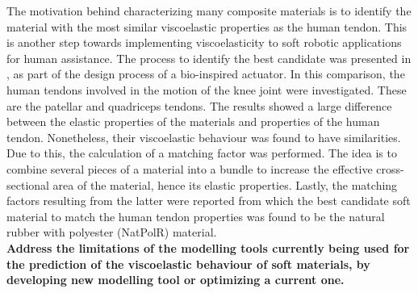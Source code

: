 The motivation behind characterizing many composite materials is to identify the material with the most similar viscoelastic properties as the human tendon. This is another step towards implementing viscoelasticity to soft robotic applications for human assistance. The process to identify the best candidate was presented in , as part of the design process of a bio-inspired actuator. In this comparison, the human tendons involved in the motion of the knee joint were investigated. These are the patellar and quadriceps tendons. The results showed a large difference between the elastic properties of the materials and properties of the human tendon. Nonetheless, their viscoelastic behaviour was found to have similarities. Due to this, the calculation of a matching factor was performed. The idea is to combine several pieces of a material into a bundle to increase the effective cross-sectional area of the material, hence its elastic properties. Lastly, the matching factors resulting from the latter were reported from which the best candidate soft material to match the human tendon properties was found to be the natural rubber with polyester (NatPolR) material.
\\[1em]
\noindent \textbf{\large{ Address the limitations of the modelling tools currently being used for the prediction of the viscoelastic behaviour of soft materials, by developing new modelling tool or optimizing a current one. }}

